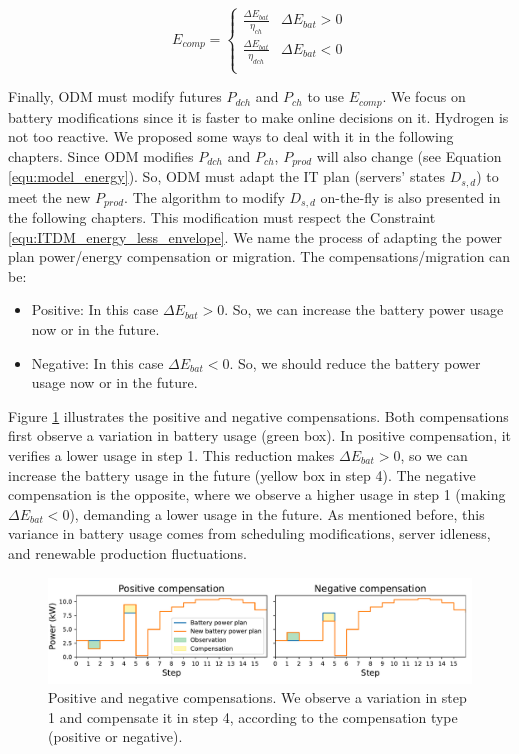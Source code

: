 \begin{equation}
    \label{equ:energy_battery}
    E_{comp} = \begin{cases}
        \frac{\Delta E_{bat}}{\eta_{ch}} & \Delta E_{bat} > 0 \\
        \frac{\Delta E_{bat}}{\eta_{dch}} & \Delta E_{bat} < 0 \\
    \end{cases}
\end{equation}

Finally, ODM must modify futures $P_{dch}$ and $P_{ch}$ to use $E_{comp}$. We focus on battery modifications since it is faster to make online decisions on it. Hydrogen is not too reactive. We proposed some ways to deal with it in the following chapters. Since ODM modifies $P_{dch}$ and $P_{ch}$, $P_{prod}$ will also change (see Equation \ref{equ:model_energy}). So, ODM must adapt the IT plan (servers' states $D_{s,d}$) to meet the new $P_{prod}$. The algorithm to modify $D_{s,d}$ on-the-fly is also presented in the following chapters. This modification must respect the Constraint \ref{equ:ITDM_energy_less_envelope}. We name the process of adapting the power plan power/energy compensation or migration. The compensations/migration can be:

\begin{itemize}
    \item Positive: In this case $\Delta E_{bat} > 0$. So, we can increase the battery power usage now or in the future.
    \item Negative: In this case $\Delta E_{bat} < 0$. So, we should reduce the battery power usage now or in the future.
\end{itemize}

Figure \ref{fig:model_compensation} illustrates the positive and negative compensations. Both compensations first observe a variation in battery usage (green box). In positive compensation, it verifies a lower usage in step 1. This reduction makes $\Delta E_{bat} > 0$, so we can increase the battery usage in the future (yellow box in step 4). The negative compensation is the opposite, where we observe a higher usage in step 1 (making $\Delta E_{bat} < 0$), demanding a lower usage in the future. As mentioned before, this variance in battery usage comes from scheduling modifications, server idleness, and renewable production fluctuations.

\begin{figure}[!htb]
    \centering
    \includegraphics[scale=0.58]{Images/Model/compensation.pdf}
    \caption[Positive and negative compensations]{Positive and negative compensations. We observe a variation in step 1 and compensate it in step 4, according to the compensation type (positive or negative).}
    \label{fig:model_compensation}
\end{figure}

